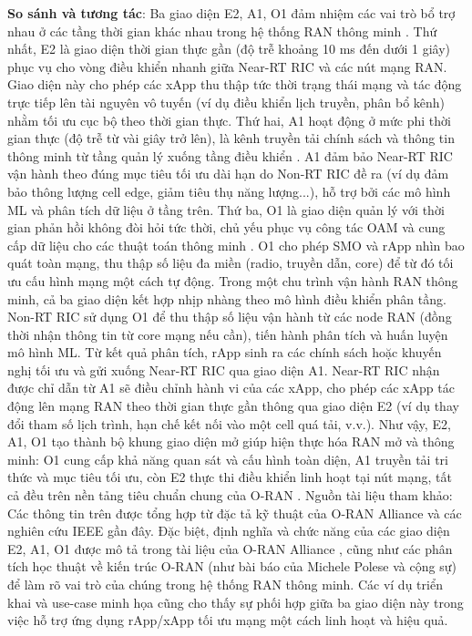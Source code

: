 \textbf{So sánh và tương tác}: Ba giao diện E2, A1, O1 đảm nhiệm các vai trò bổ trợ nhau ở các tầng thời gian khác nhau trong hệ thống RAN thông minh \cite{Understanding_O-Ran}. Thứ nhất, E2 là giao diện thời gian thực gần (độ trễ khoảng 10 ms đến dưới 1 giây) phục vụ cho vòng điều khiển nhanh giữa Near-RT RIC và các nút mạng RAN. Giao diện này cho phép các xApp thu thập tức thời trạng thái mạng và tác động trực tiếp lên tài nguyên vô tuyến (ví dụ điều khiển lịch truyền, phân bổ kênh) nhằm tối ưu cục bộ theo thời gian thực. Thứ hai, A1 hoạt động ở mức phi thời gian thực (độ trễ từ vài giây trở lên), là kênh truyền tải chính sách và thông tin thông minh từ tầng quản lý xuống tầng điều khiển \cite{frontiers}. A1 đảm bảo Near-RT RIC vận hành theo đúng mục tiêu tối ưu dài hạn do Non-RT RIC đề ra (ví dụ đảm bảo thông lượng cell edge, giảm tiêu thụ năng lượng...), hỗ trợ bởi các mô hình ML và phân tích dữ liệu ở tầng trên. Thứ ba, O1 là giao diện quản lý với thời gian phản hồi không đòi hỏi tức thời, chủ yếu phục vụ công tác OAM và cung cấp dữ liệu cho các thuật toán thông minh \cite{Understanding_O-Ran}. O1 cho phép SMO và rApp nhìn bao quát toàn mạng, thu thập số liệu đa miền (radio, truyền dẫn, core) để từ đó tối ưu cấu hình mạng một cách tự động. Trong một chu trình vận hành RAN thông minh, cả ba giao diện kết hợp nhịp nhàng theo mô hình điều khiển phân tầng. Non-RT RIC sử dụng O1 để thu thập số liệu vận hành từ các node RAN (đồng thời nhận thông tin từ core mạng nếu cần), tiến hành phân tích và huấn luyện mô hình ML. Từ kết quả phân tích, rApp sinh ra các chính sách hoặc khuyến nghị tối ưu và gửi xuống Near-RT RIC qua giao diện A1\cite{Understanding_O-Ran}. Near-RT RIC nhận được chỉ dẫn từ A1 sẽ điều chỉnh hành vi của các xApp, cho phép các xApp tác động lên mạng RAN theo thời gian thực gần thông qua giao diện E2 (ví dụ thay đổi tham số lịch trình, hạn chế kết nối vào một cell quá tải, v.v.). Như vậy, E2, A1, O1 tạo thành bộ khung giao diện mở giúp hiện thực hóa RAN mở và thông minh: O1 cung cấp khả năng quan sát và cấu hình toàn diện, A1 truyền tải tri thức và mục tiêu tối ưu, còn E2 thực thi điều khiển linh hoạt tại nút mạng, tất cả đều trên nền tảng tiêu chuẩn chung của O-RAN \cite{frontiers}. Nguồn tài liệu tham khảo: Các thông tin trên được tổng hợp từ đặc tả kỹ thuật của O-RAN Alliance và các nghiên cứu IEEE gần đây. Đặc biệt, định nghĩa và chức năng của các giao diện E2, A1, O1 được mô tả trong tài liệu của O-RAN Alliance \cite{frontiers}, cũng như các phân tích học thuật về kiến trúc O-RAN (như bài báo của Michele Polese và cộng sự) để làm rõ vai trò của chúng trong hệ thống RAN thông minh. Các ví dụ triển khai và use-case minh họa cũng cho thấy sự phối hợp giữa ba giao diện này trong việc hỗ trợ ứng dụng rApp/xApp tối ưu mạng một cách linh hoạt và hiệu quả.
